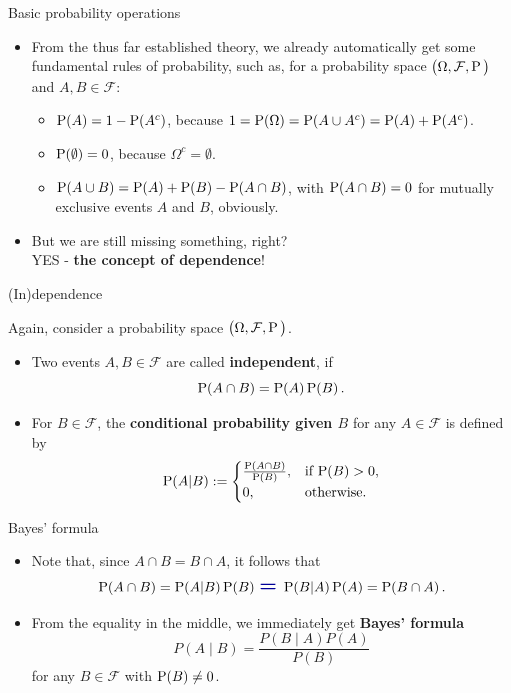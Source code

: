\documentclass[a4,11pt]{beamer}
\newlength{\wideitemsep}
\let\olditem\item
\renewcommand{\item}{\setlength{\itemsep}{\wideitemsep}\olditem}
\begin{document}
\begin{frame}{Basic probability operations}
    \begin{itemize}
        \item From the thus far established theory, we already automatically get some fundamental rules of probability, such as, for a probability space $\big(\Omega,\mathcal{F},\operatorname{P}\big)$ and $A,B\in\mathcal{F}$:\medskip\\\begin{itemize}
            \item \textcolor{blueberry}{$\operatorname{P}(A)=1-\operatorname{P}(A^c)$}, because $1=\operatorname{P}(\Omega)=\operatorname{P}(A\cup A^c)=\operatorname{P}(A)+\operatorname{P}(A^c)$.
            \item \textcolor{blueberry}{$\operatorname{P}(\emptyset)=0$}, because $\Omega^c=\emptyset$.
            \item \textcolor{blueberry}{$\operatorname{P}(A\cup B)=\operatorname{P}(A)+\operatorname{P}(B)-\operatorname{P}(A\cap B)$}, with $\operatorname{P}(A\cap B)=0$ for mutually exclusive events $A$ and $B$, obviously.
        \end{itemize}
        \item But we are still missing something, right?\\
YES - \textcolor{blueberry}{\textbf{the concept of dependence}}!

    \end{itemize}
\end{frame}

\begin{frame}{(In)dependence}
\begin{definition}
Again, consider a probability space $\big(\Omega,\mathcal{F},\operatorname{P}\big)$.\,\bigskip\\
\begin{itemize}
    \item Two events $A,B\in\mathcal{F}$ are called \textbf{independent}, if $$\operatorname{P}(A\cap B)=\operatorname{P}(A)\operatorname{P}(B)\,.$$
    \item For $B\in\mathcal{F}$, the \textbf{conditional probability given $B$} for any $A\in\mathcal{F}$ is defined by $$\operatorname{P}(A\vert B):=\begin{cases}
        \frac{\operatorname{P}(A\cap B)}{\operatorname{P}(B)},&\text{if $\operatorname{P}(B)>0$,}\\
        0,&\text{otherwise.}
    \end{cases}$$
\end{itemize}
\end{definition}

\end{frame}

\begin{frame}{Bayes' formula}
    \begin{itemize}
        \item Note that, since $A\cap B=B\cap A$, it follows that $$\pr(A\cap B)=\pr(A\vert B)\pr(B)\,\,\text{\textcolor{blueberry}{\Large$\bm{=}$}}\,\,\pr(B\vert A)\pr(A)=\pr(B\cap A)\,.$$
        \item From the equality in the middle, we immediately get \textbf{Bayes' formula} $${\displaystyle P(A\mid B)={\frac {P(B\mid A)P(A)}{P(B)}}}$$ for any $B\in\mathcal{F}$ with $\operatorname{P}(B)\ne 0$.
    \end{itemize}
\end{frame}
\end{document}
